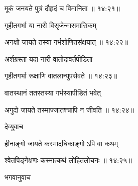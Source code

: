 
{\devanagarifont मूकं जनयते पुत्रं दौहृदं च विमानिता {॥ १४:२१॥} \veg\dontdisplaylinenum }%

{\devanagarifont गृहीतगर्भा या नारी विसृजेन्मासमासिकम् \thinspace{\dandab} \dontdisplaylinenum }%


{\devanagarifont अनक्षो जायते तस्या गर्भशोणितसंक्षयात् {॥ १४:२२॥} \veg\dontdisplaylinenum }%

{\devanagarifont अर्शग्रस्ता यदा नारी वातोदावर्तपीडिता \thinspace{\dandab} \dontdisplaylinenum }%


{\devanagarifont गृहीतगर्भा रूक्षाणि वातलान्युपसेवते {॥ १४:२३॥} \veg\dontdisplaylinenum }%

{\devanagarifont वातस्थानं ततस्तस्या गर्भस्यापीडितं भवेत् \thinspace{\dandab} \dontdisplaylinenum }%
 

{\devanagarifont अगुदो जायते तस्माज्जातश्चापि न जीवति {॥ १४:२४॥} \veg\dontdisplaylinenum }%
  
{\devanagarifont देव्युवाच {\dandab}\dontdisplaylinenum  }%
 
{\devanagarifont हीनाङ्गो जायते कस्मादधिकाङ्गो ऽपि वा कथम् \thinspace{\danda} \dontdisplaylinenum }%
 

{\devanagarifont श्वेतपिङ्गेक्षणः कस्मात्कथं लोहितलोचनः {॥ १४:२५॥} \veg\dontdisplaylinenum }%
 
{\devanagarifont भगवानुवाच {\dandab}\dontdisplaylinenum  }%
 
